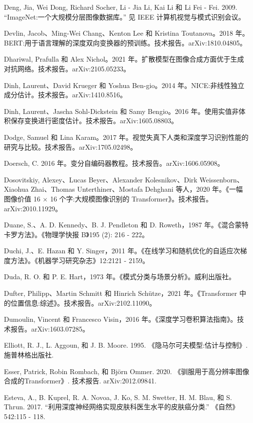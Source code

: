 \documentclass[10pt]{article}
\begin{document}
Deng, Jia, Wei Dong, Richard Socher, Li - Jia Li, Kai Li 和 Li Fei - Fei. 2009. “ImageNet:一个大规模分层图像数据库。” 见 IEEE 计算机视觉与模式识别会议。

Devlin, Jacob、Ming-Wei Chang、Kenton Lee 和 Kristina Toutanova。2018 年。BERT:用于语言理解的深度双向变换器的预训练。技术报告。arXiv:1810.04805。

Dhariwal, Prafulla 和 Alex Nichol。2021 年。扩散模型在图像合成方面优于生成对抗网络。技术报告。arXiv:2105.05233。

Dinh, Laurent、David Krueger 和 Yoshua Ben-gio。2014 年。NICE:非线性独立成分估计。技术报告。arXiv:1410.8516。

Dinh, Laurent、Jascha Sohl-Dickstein 和 Samy Bengio。2016 年。使用实值非体积保存变换进行密度估计。技术报告。arXiv:1605.08803。

Dodge, Samuel 和 Lina Karam。2017 年。视觉失真下人类和深度学习识别性能的研究与比较。技术报告。arXiv:1705.02498。

Doersch, C. 2016 年。变分自编码器教程。技术报告。arXiv:1606.05908。

Dosovitskiy, Alexey、Lucas Beyer、Alexander Kolesnikov、Dirk Weissenborn、Xiaohua Zhai、Thomas Unterthiner、Mostafa Dehghani 等人，2020 年。《一幅图像价值 16 \(\times\) 16 个字:大规模图像识别的 Transformer》。技术报告。arXiv:2010.11929。

Duane, S.、A. D. Kennedy、B. J. Pendleton 和 D. Roweth，1987 年。《混合蒙特卡罗方法》。《物理学快报 B》195 (2): 216 - 222。

Duchi, J.、E. Hazan 和 Y. Singer，2011 年。《在线学习和随机优化的自适应次梯度方法》。《机器学习研究杂志》12:2121 - 2159。

Duda, R. O. 和 P. E. Hart，1973 年。《模式分类与场景分析》。威利出版社。

Dufter, Philipp、Martin Schmitt 和 Hinrich Schütze，2021 年。《Transformer 中的位置信息:综述》。技术报告。arXiv:2102.11090。

Dumoulin, Vincent 和 Francesco Visin，2016 年。《深度学习卷积算法指南》。技术报告。arXiv:1603.07285。

Elliott, R. J., L. Aggoun, 和 J. B. Moore. 1995. 《隐马尔可夫模型:估计与控制》. 施普林格出版社.

Esser, Patrick, Robin Rombach, 和 Björn Ommer. 2020. 《驯服用于高分辨率图像合成的Transformer》. 技术报告. arXiv:2012.09841.

Esteva, A., B. Kuprel, R. A. Novoa, J. Ko, S. M. Swetter, H. M. Blau, 和 S. Thrun. 2017. “利用深度神经网络实现皮肤科医生水平的皮肤癌分类.” 《自然》542:115 - 118.
\end{document}
